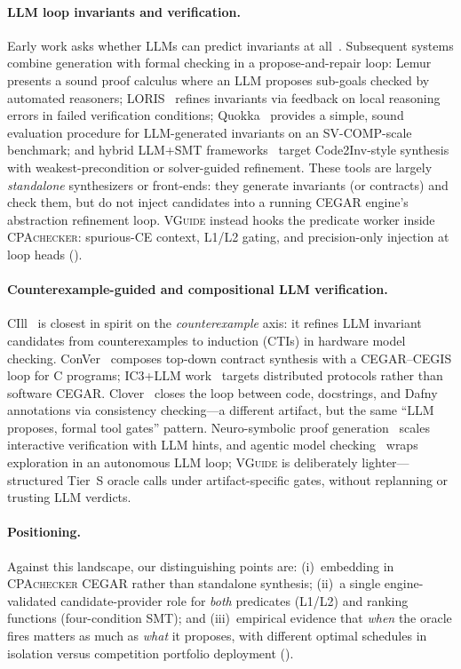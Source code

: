 \documentclass[runningheads]{llncs}
\newcommand{\tool}{\textsc{VGuide}}
\newcommand{\cpa}{\textsc{CPAchecker}}
\begin{document}
\paragraph{LLM loop invariants and verification.}
Early work asks whether LLMs can predict invariants at all~\cite{pei2023}.
Subsequent systems combine generation with formal checking in a propose-and-repair loop:
Lemur~\cite{lemur2024} presents a sound proof calculus where an LLM proposes sub-goals checked by
automated reasoners; LORIS~\cite{loris2026} refines invariants via feedback on local reasoning
errors in failed verification conditions; Quokka~\cite{quokka2025} provides a simple, sound
evaluation procedure for LLM-generated invariants on an SV-COMP-scale benchmark; and hybrid
LLM+SMT frameworks~\cite{loopinvariant2025,neuroinv2025} target Code2Inv-style synthesis with
weakest-precondition or solver-guided refinement.
These tools are largely \emph{standalone} synthesizers or front-ends: they generate invariants
(or contracts) and check them, but do not inject candidates into a running CEGAR engine's
abstraction refinement loop.
\tool{} instead hooks the predicate worker inside \cpa{}: spurious-CE context, L1/L2 gating, and
precision-only injection at loop heads ().

\paragraph{Counterexample-guided and compositional LLM verification.}
CIll~\cite{cill2026} is closest in spirit on the \emph{counterexample} axis: it refines LLM
invariant candidates from counterexamples to induction (CTIs) in hardware model checking.
ConVer~\cite{conver2026} composes top-down contract synthesis with a CEGAR--CEGIS loop for C
programs; IC3+LLM work~\cite{ic3llm2026} targets distributed protocols rather than software CEGAR.
Clover~\cite{clover2024} closes the loop between code, docstrings, and Dafny annotations via
consistency checking---a different artifact, but the same ``LLM proposes, formal tool gates''
pattern.
Neuro-symbolic proof generation~\cite{neurosymbolic2026} scales interactive verification with LLM
hints, and agentic model checking~\cite{agenticmc2026} wraps exploration in an autonomous LLM
loop; \tool{} is deliberately lighter---structured Tier~S oracle calls under artifact-specific
gates, without replanning or trusting LLM verdicts.

\paragraph{Positioning.}
Against this landscape, our distinguishing points are: (i)~embedding in \cpa{} CEGAR rather than
standalone synthesis; (ii)~a single engine-validated candidate-provider role for \emph{both}
predicates (L1/L2) and ranking functions (four-condition SMT); and (iii)~empirical evidence that
\emph{when} the oracle fires matters as much as \emph{what} it proposes, with different optimal
schedules in isolation versus competition portfolio deployment ().
\end{document}
